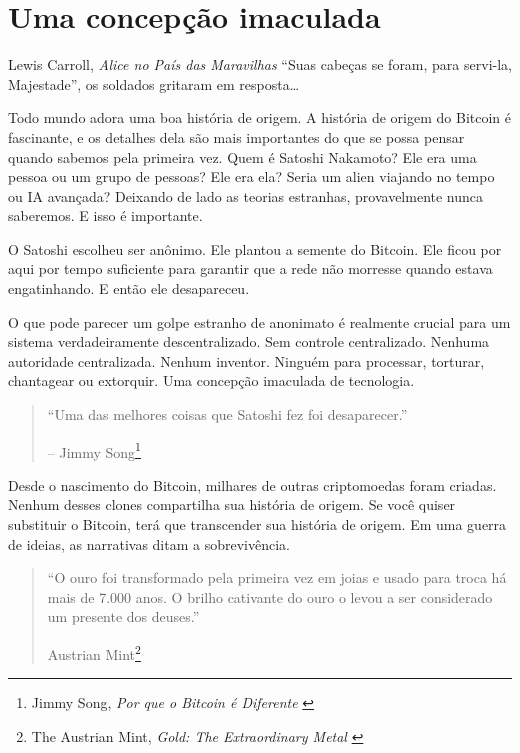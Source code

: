 \chapter{Uma concepção imaculada}
\label{les:5}

\begin{chapquote}{Lewis Carroll, \textit{Alice no País das Maravilhas}}
\enquote{Suas cabeças se foram, para servi-la, Majestade}, os soldados gritaram em resposta\ldots
\end{chapquote}

Todo mundo adora uma boa história de origem. A história de origem do Bitcoin é fascinante, e os detalhes dela são mais importantes do que se possa pensar quando sabemos pela primeira vez. Quem é Satoshi Nakamoto? Ele era uma pessoa ou um grupo de pessoas? Ele era ela? Seria um alien viajando no tempo ou IA avançada? Deixando de lado as teorias estranhas, provavelmente nunca saberemos. E isso é importante.

O Satoshi escolheu ser anônimo. Ele plantou a semente do Bitcoin. Ele ficou por aqui por tempo suficiente para garantir que a rede não morresse quando estava engatinhando. E então ele desapareceu.

O que pode parecer um golpe estranho de anonimato é realmente crucial para um sistema verdadeiramente descentralizado. Sem controle centralizado. Nenhuma autoridade centralizada. Nenhum inventor. Ninguém para processar, torturar, chantagear ou extorquir. Uma concepção imaculada de tecnologia.

\begin{quotation}\begin{samepage}
\enquote{Uma das melhores coisas que Satoshi fez foi desaparecer.}
\begin{flushright} -- Jimmy Song\footnote{Jimmy Song, \textit{Por que o Bitcoin é Diferente} \cite{bitcoin-different}}
\end{flushright}\end{samepage}\end{quotation}

\newpage

Desde o nascimento do Bitcoin, milhares de outras criptomoedas foram criadas. Nenhum desses clones compartilha sua história de origem. Se você quiser substituir o Bitcoin, terá que transcender sua história de origem. Em uma guerra de ideias, as narrativas ditam a sobrevivência.

\begin{quotation}\begin{samepage}
\enquote{O ouro foi transformado pela primeira vez em joias e usado para troca há mais de 7.000 anos. O brilho cativante do ouro o levou a ser considerado um presente
dos deuses.}
\begin{flushright} Austrian Mint\footnote{The Austrian Mint, \textit{Gold: The Extraordinary Metal} \cite{gold-gift-gods}}
\end{flushright}\end{samepage}\end{quotation}

